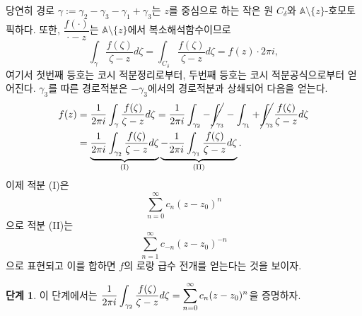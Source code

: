 당연히
경로 $\gamma := \gamma_2 - \gamma_3 - \gamma_1 + \gamma_3$는
$z$를 중심으로 하는 작은 원 $C_\delta$와 $\mathbb A\setminus \{z\}$-호모토픽하다.
또한, $\dfrac{f(\cdot)}{\cdot-z}$는 $\mathbb A\setminus \{z\}$에서
복소해석함수이므로
\[
\int_\gamma \dfrac{f(\zeta)}{\zeta-z} d\zeta
= \int_{C_\delta} \dfrac{f(\zeta)}{\zeta-z} d\zeta
= f(z) \cdot 2\pi i,
\]
여기서 첫번째 등호는 코시 적분정리로부터,
두번째 등호는 코시 적분공식으로부터 얻어진다.
$\gamma_3$를 따른 경로적분은 $-\gamma_3$에서의 경로적분과 상쇄되어 다음을 얻는다.
\begin{align*}
f(z) &= \dfrac1{2\pi i} \int_\gamma \dfrac{f(\zeta)}{\zeta-z}d\zeta
= \dfrac1{2\pi i} \int_{\gamma_2} - \cancel{ \int_{\gamma_3}}
-  \int_{\gamma_1} + \cancel{\int_{\gamma_3 }}\dfrac{f(\zeta)}{\zeta-z}d\zeta \\
&= \underbrace{\dfrac1{2\pi i} \int_{\gamma_2} \dfrac{f(\zeta)}{\zeta-z}d\zeta}_{\text{(I)}}
\underbrace{-\dfrac1{2\pi i} \int_{\gamma_1} \dfrac{f(\zeta)}{\zeta-z}d\zeta}_{\text{(II)}}.
\end{align*}
이제 적분 (I)은
\[
\sum_{n=0}^\infty c_n(z-z_0)^n
\]
으로 적분 (II)는 
\[
\sum_{n=1}^\infty c_{-n}(z-z_0)^{-n}
\]
으로 표현되고 이를 합하면 $f$의 로랑 급수 전개를 얻는다는 것을 보이자.

{\bf 단계 1}.
이 단계에서는 $\dfrac1{2\pi i} \dint_{\gamma_2} \dfrac{f(\zeta)}{\zeta-z}d\zeta
= \Sum_{n=0}^\infty c_n(z-z_0)^n$을 증명하자.

